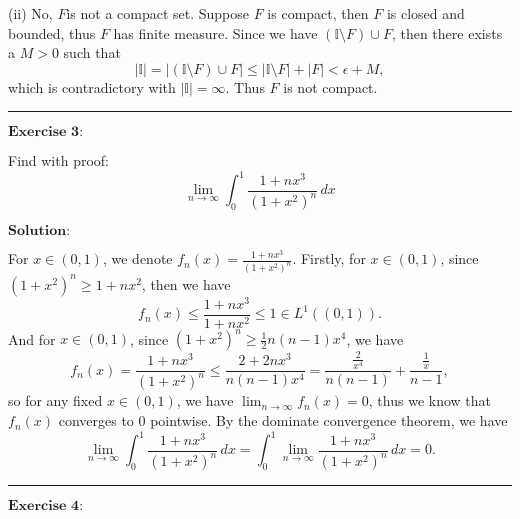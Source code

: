 \documentclass[12pt]{article}
\begin{document}
(ii) No, $F$is not a compact set. Suppose $F$ is compact, then $F$ is closed and bounded, thus $F$ has finite measure. Since we have $(\mathbb{I} \setminus F) \cup F$, then there exists a $M > 0$ such that 
\begin{equation*}
    |\mathbb{I}| = |(\mathbb{I} \setminus F) \cup F| \leq |\mathbb{I} \setminus F| + |F| < \epsilon + M,
\end{equation*}
which is contradictory with $|\mathbb{I}| = \infty$. Thus $F$ is not compact.

\vspace{8pt}

\noindent\rule[0.25\baselineskip]{\textwidth}{0.5pt}

$\textbf{Exercise 3:}$

Find with proof:
\begin{equation*}
    \lim_{n \to \infty} \int_{0}^{1} \frac{1 + n x^{3}}{(1 + x^{2})^{n}} \, d x 
\end{equation*}

\vspace{8pt}
$\textbf{Solution:}$

For $x \in (0, 1)$, we denote $f_{n}(x) = \frac{1 + n x^{3}}{(1 + x^{2})^{n}}$. Firstly, for $x \in (0, 1)$, since $(1 + x^{2})^{n} \geq 1 + n x^{2}$, then we have
\begin{equation*}
    f_{n}(x) \leq \frac{1 + n x^{3}}{1 + n x^{2}} \leq 1 \in L^{1}((0, 1)).
\end{equation*}
And for $x \in (0, 1)$, since $(1 + x^{2})^{n} \geq \frac{1}{2}n(n-1) x^{4}$, we have
\begin{equation*}
    f_{n}(x) = \frac{1 + n x^{3}}{(1 + x^{2})^{n}} \leq \frac{2 + 2 n x^{3}}{n(n-1) x^{4}}  = \frac{\frac{2}{x^{4}}}{n(n - 1)} + \frac{\frac{1}{x}}{n-1},
\end{equation*}
so for any fixed $x \in (0, 1)$, we have $\lim_{n \to \infty} f_{n} (x) = 0$, thus we know that $f_{n}(x)$ converges to $0$ pointwise. By the dominate convergence theorem, we have
\begin{equation*}
    \lim_{n \to \infty} \int_{0}^{1} \frac{1 + n x^{3}}{(1 + x^{2})^{n}} \, d x = \int_{0}^{1} \lim_{n \to \infty} \frac{1 + n x^{3}}{(1 + x^{2})^{n}} \, d x = 0.
\end{equation*}

\vspace{8pt}

\noindent\rule[0.25\baselineskip]{\textwidth}{0.5pt}

$\textbf{Exercise 4:}$
\end{document}

